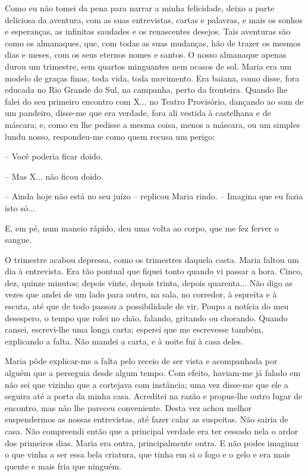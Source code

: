 Como eu não tomei da pena para narrar a minha felicidade, deixo a parte
deliciosa da aventura, com as suas entrevistas, cartas e palavras, e
mais os sonhos e esperanças, as infinitas saudades e os renascentes
desejos. Tais aventuras são como os almanaques, que, com todas as suas
mudanças, hão de trazer os mesmos dias e meses, com os seus eternos
nomes e santos. O nosso almanaque apenas durou um trimestre, sem quartos
minguantes nem ocasos de sol. Maria era um modelo de graças finas, toda
vida, toda movimento. Era baiana, como disse, fora educada no Rio Grande
do Sul, na campanha, perto da fronteira. Quando lhe falei do seu
primeiro encontro com X... no Teatro Provisório, dançando ao som de um
pandeiro, disse-me que era verdade, fora ali vestida à castelhana e de
máscara; e, como eu lhe pedisse a mesma coisa, menos a máscara, ou um
simples lundu nosso, respondeu-me como quem recusa um perigo:

-- Você poderia ficar doido.

-- Mas X... não ficou doido.

-- Ainda hoje não está no seu juízo -- replicou Maria rindo. -- Imagina
que eu fazia isto só...

E, em pé, num maneio rápido, deu uma volta ao corpo, que me fez ferver o
sangue.

O trimestre acabou depressa, como os trimestres daquela casta. Maria
faltou um dia à entrevista. Era tão pontual que fiquei tonto quando vi
passar a hora. Cinco, dez, quinze minutos; depois vinte, depois trinta,
depois quarenta... Não digo as vezes que andei de um lado para outro, na
sala, no corredor, à espreita e à escuta, até que de todo passou a
possibilidade de vir. Poupo a notícia do meu desespero, o tempo que
rolei no chão, falando, gritando ou chorando. Quando cansei, escrevi-lhe
uma longa carta; esperei que me escrevesse também, explicando a falta.
Não mandei a carta, e à noite fui à casa deles.

Maria pôde explicar-me a falta pelo receio de ser vista e acompanhada
por alguém que a perseguia desde algum tempo. Com efeito, haviam-me já
falado em não sei que vizinho que a cortejava com instância; uma vez
disse-me que ele a seguira até a porta da minha casa. Acreditei na razão
e propus-lhe outro lugar de encontro, mas não lhe pareceu conveniente.
Desta vez achou melhor suspendermos as nossas entrevistas, até fazer
calar as suspeitas. Não sairia de casa. Não compreendi então que a
principal verdade era ter cessado nela o ardor dos primeiros dias. Maria
era outra, principalmente outra. E não podes imaginar o que vinha a ser
essa bela criatura, que tinha em si o fogo e o gelo e era mais quente e
mais fria que ninguém.

